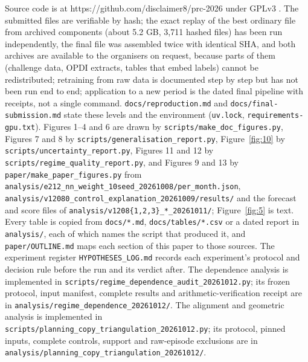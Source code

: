 \documentclass[11pt,a4paper]{article}
\begin{document}
Source code is at https://github.com/disclaimer8/prc-2026 under GPLv3 \autocite{kolomiiets2026repo}. The submitted files are verifiable by hash; the exact replay of the best ordinary file from archived components (about 5.2 GB, 3,711 hashed files) has been run independently, the final file was assembled twice with identical SHA, and both archives are available to the organisers on request, because parts of them (challenge data, OPDI extracts, tables that embed labels) cannot be redistributed; retraining from raw data is documented step by step but has not been run end to end; application to a new period is the dated final pipeline with receipts, not a single command. \texttt{docs/\allowbreak{}reproduction.md} and \texttt{docs/\allowbreak{}final-submission.md} state these levels and the environment (\texttt{uv.lock}, \texttt{requirements-gpu.txt}). Figures 1--4 and 6 are drawn by \texttt{scripts/\allowbreak{}make\_\allowbreak{}doc\_\allowbreak{}figures.py}, Figures 7 and 8 by \texttt{scripts/\allowbreak{}generalisation\_\allowbreak{}report.py}, Figure~\ref{fig:10} by \texttt{scripts/\allowbreak{}uncertainty\_\allowbreak{}report.py}, Figures 11 and 12 by \texttt{scripts/\allowbreak{}regime\_\allowbreak{}quality\_\allowbreak{}report.py}, and Figures 9 and 13 by \texttt{paper/\allowbreak{}make\_\allowbreak{}paper\_\allowbreak{}figures.py} from \texttt{analysis/\allowbreak{}e212\_\allowbreak{}nn\_\allowbreak{}weight\_\allowbreak{}10seed\_\allowbreak{}20261008/\allowbreak{}per\_\allowbreak{}month.json}, \texttt{analysis/\allowbreak{}v12080\_\allowbreak{}control\_\allowbreak{}explanation\_\allowbreak{}20261009/\allowbreak{}results/\allowbreak{}} and the forecast and score files of \texttt{analysis/v1208\{1,2,3\}\_*\_20261011/}; Figure~\ref{fig:5} is text. Every table is copied from \texttt{docs/\allowbreak{}*.md}, \texttt{docs/\allowbreak{}tables/\allowbreak{}*.csv} or a dated report in \texttt{analysis/\allowbreak{}}, each of which names the script that produced it, and \texttt{paper/\allowbreak{}OUTLINE.md} maps each section of this paper to those sources. The experiment register \texttt{HYPOTHESES\_\allowbreak{}LOG.md} records each experiment's protocol and decision rule before the run and its verdict after. The dependence analysis is implemented in \texttt{scripts/\allowbreak{}regime\_\allowbreak{}dependence\_\allowbreak{}audit\_\allowbreak{}20261012.py}; its frozen protocol, input manifest, complete results and arithmetic-verification receipt are in \texttt{analysis/\allowbreak{}regime\_\allowbreak{}dependence\_\allowbreak{}20261012/\allowbreak{}}. The alignment and geometric analysis is implemented in \texttt{scripts/\allowbreak{}planning\_\allowbreak{}copy\_\allowbreak{}triangulation\_\allowbreak{}20261012.py}; its protocol, pinned inputs, complete controls, support and raw-episode exclusions are in \texttt{analysis/\allowbreak{}planning\_\allowbreak{}copy\_\allowbreak{}triangulation\_\allowbreak{}20261012/\allowbreak{}}.
\end{document}
